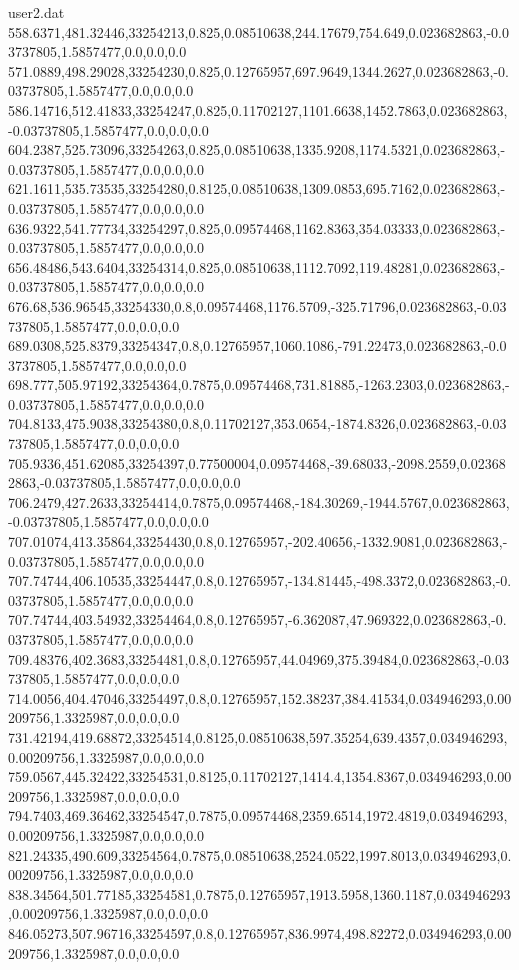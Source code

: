 \begin{filecontents}{user2.dat}
558.6371,481.32446,33254213,0.825,0.08510638,244.17679,754.649,0.023682863,-0.03737805,1.5857477,0.0,0.0,0.0
571.0889,498.29028,33254230,0.825,0.12765957,697.9649,1344.2627,0.023682863,-0.03737805,1.5857477,0.0,0.0,0.0
586.14716,512.41833,33254247,0.825,0.11702127,1101.6638,1452.7863,0.023682863,-0.03737805,1.5857477,0.0,0.0,0.0
604.2387,525.73096,33254263,0.825,0.08510638,1335.9208,1174.5321,0.023682863,-0.03737805,1.5857477,0.0,0.0,0.0
621.1611,535.73535,33254280,0.8125,0.08510638,1309.0853,695.7162,0.023682863,-0.03737805,1.5857477,0.0,0.0,0.0
636.9322,541.77734,33254297,0.825,0.09574468,1162.8363,354.03333,0.023682863,-0.03737805,1.5857477,0.0,0.0,0.0
656.48486,543.6404,33254314,0.825,0.08510638,1112.7092,119.48281,0.023682863,-0.03737805,1.5857477,0.0,0.0,0.0
676.68,536.96545,33254330,0.8,0.09574468,1176.5709,-325.71796,0.023682863,-0.03737805,1.5857477,0.0,0.0,0.0
689.0308,525.8379,33254347,0.8,0.12765957,1060.1086,-791.22473,0.023682863,-0.03737805,1.5857477,0.0,0.0,0.0
698.777,505.97192,33254364,0.7875,0.09574468,731.81885,-1263.2303,0.023682863,-0.03737805,1.5857477,0.0,0.0,0.0
704.8133,475.9038,33254380,0.8,0.11702127,353.0654,-1874.8326,0.023682863,-0.03737805,1.5857477,0.0,0.0,0.0
705.9336,451.62085,33254397,0.77500004,0.09574468,-39.68033,-2098.2559,0.023682863,-0.03737805,1.5857477,0.0,0.0,0.0
706.2479,427.2633,33254414,0.7875,0.09574468,-184.30269,-1944.5767,0.023682863,-0.03737805,1.5857477,0.0,0.0,0.0
707.01074,413.35864,33254430,0.8,0.12765957,-202.40656,-1332.9081,0.023682863,-0.03737805,1.5857477,0.0,0.0,0.0
707.74744,406.10535,33254447,0.8,0.12765957,-134.81445,-498.3372,0.023682863,-0.03737805,1.5857477,0.0,0.0,0.0
707.74744,403.54932,33254464,0.8,0.12765957,-6.362087,47.969322,0.023682863,-0.03737805,1.5857477,0.0,0.0,0.0
709.48376,402.3683,33254481,0.8,0.12765957,44.04969,375.39484,0.023682863,-0.03737805,1.5857477,0.0,0.0,0.0
714.0056,404.47046,33254497,0.8,0.12765957,152.38237,384.41534,0.034946293,0.00209756,1.3325987,0.0,0.0,0.0
731.42194,419.68872,33254514,0.8125,0.08510638,597.35254,639.4357,0.034946293,0.00209756,1.3325987,0.0,0.0,0.0
759.0567,445.32422,33254531,0.8125,0.11702127,1414.4,1354.8367,0.034946293,0.00209756,1.3325987,0.0,0.0,0.0
794.7403,469.36462,33254547,0.7875,0.09574468,2359.6514,1972.4819,0.034946293,0.00209756,1.3325987,0.0,0.0,0.0
821.24335,490.609,33254564,0.7875,0.08510638,2524.0522,1997.8013,0.034946293,0.00209756,1.3325987,0.0,0.0,0.0
838.34564,501.77185,33254581,0.7875,0.12765957,1913.5958,1360.1187,0.034946293,0.00209756,1.3325987,0.0,0.0,0.0
846.05273,507.96716,33254597,0.8,0.12765957,836.9974,498.82272,0.034946293,0.00209756,1.3325987,0.0,0.0,0.0

\end{filecontents}

